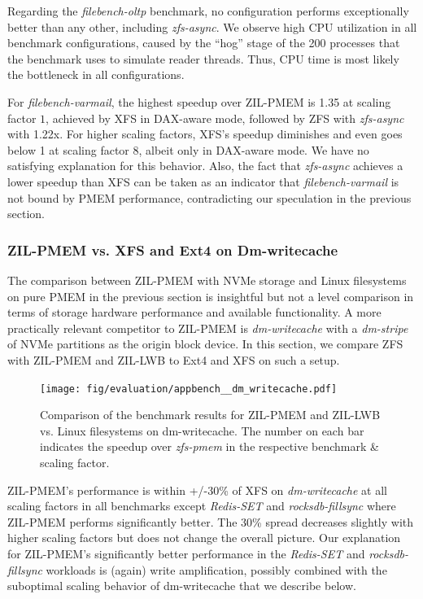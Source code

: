 \documentclass[12pt,a4paper,twoside]{book}
\begin{document}
Regarding the \textit{filebench-oltp} benchmark, no configuration performs exceptionally better than any other, including \textit{zfs-async}.
We observe high CPU utilization in all benchmark configurations, caused by the ``hog'' stage of the 200 processes that the benchmark uses to simulate reader threads.
Thus, CPU time is most likely the bottleneck in all configurations.

For \textit{filebench-varmail}, the highest speedup over ZIL-PMEM is 1.35 at scaling factor $1$, achieved by XFS in DAX-aware mode, followed by ZFS with \textit{zfs-async} with 1.22x.
For higher scaling factors, XFS's speedup diminishes and even goes below 1 at scaling factor $8$, albeit only in DAX-aware mode.
We have no satisfying explanation for this behavior.
Also, the fact that \textit{zfs-async} achieves a lower speedup than XFS can be taken as an indicator that \textit{filebench-varmail} is not bound by PMEM performance, contradicting our speculation in the previous section.

\subsubsection{ZIL-PMEM vs. XFS and Ext4 on Dm-writecache}\label{sec:eval:dmwritecache}

The comparison between ZIL-PMEM with NVMe storage and Linux filesystems on pure PMEM in the previous section is insightful but not a level comparison in terms of storage hardware performance and available functionality.
A more practically relevant competitor to ZIL-PMEM is \textit{dm-writecache} with a \textit{dm-stripe} of NVMe partitions as the origin block device.
In this section, we compare ZFS with ZIL-PMEM and ZIL-LWB to Ext4 and XFS on such a setup.

\begin{figure}[H]
    \centering
    \texttt{[image: fig/evaluation/appbench\_\_dm\_writecache.pdf]}
    \caption{
        Comparison of the benchmark results for ZIL-PMEM and ZIL-LWB vs. Linux filesystems on dm-writecache.
        The number on each bar indicates the speedup over \textit{zfs-pmem} in the respective benchmark \& scaling factor.
    }
\end{figure}

ZIL-PMEM's performance is within +/-30\% of XFS on \textit{dm-writecache} at all scaling factors in all benchmarks except \textit{Redis-SET} and \textit{rocksdb-fillsync} where ZIL-PMEM performs significantly better.
The 30\% spread decreases slightly with higher scaling factors but does not change the overall picture.
Our explanation for ZIL-PMEM's significantly better performance in the \textit{Redis-SET} and \textit{rocksdb-fillsync} workloads is (again) write amplification, possibly combined with the suboptimal scaling behavior of dm-writecache that we describe below.
\end{document}

